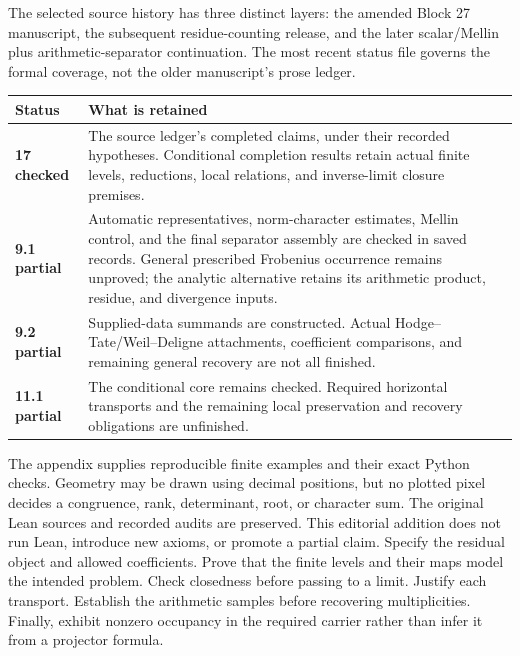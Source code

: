 The selected source history has three distinct layers: the amended Block 27 manuscript, the subsequent residue-counting release, and the later scalar/Mellin plus arithmetic-separator continuation. The most recent status file governs the formal coverage, not the older manuscript's prose ledger.
\par\noindent\begin{tabularx}{\linewidth}{@{}p{.19\linewidth}Y@{}}\toprule
Status & What is retained\\\midrule
\textbf{17 checked} & The source ledger's completed claims, under their recorded hypotheses. Conditional completion results retain actual finite levels, reductions, local relations, and inverse-limit closure premises.\\
\textbf{9.1 partial} & Automatic representatives, norm-character estimates, Mellin control, and the final separator assembly are checked in saved records. General prescribed Frobenius occurrence remains unproved; the analytic alternative retains its arithmetic product, residue, and divergence inputs.\\
\textbf{9.2 partial} & Supplied-data summands are constructed. Actual Hodge--Tate/Weil--Deligne attachments, coefficient comparisons, and remaining general recovery are not all finished.\\
\textbf{11.1 partial} & The conditional core remains checked. Required horizontal transports and the remaining local preservation and recovery obligations are unfinished.\\\bottomrule
\end{tabularx}
The appendix supplies reproducible finite examples and their exact Python checks. Geometry may be drawn using decimal positions, but no plotted pixel decides a congruence, rank, determinant, root, or character sum. The original Lean sources and recorded audits are preserved. This editorial addition does not run Lean, introduce new axioms, or promote a partial claim.
Specify the residual object and allowed coefficients. Prove that the finite levels and their maps model the intended problem. Check closedness before passing to a limit. Justify each transport. Establish the arithmetic samples before recovering multiplicities. Finally, exhibit nonzero occupancy in the required carrier rather than infer it from a projector formula.
